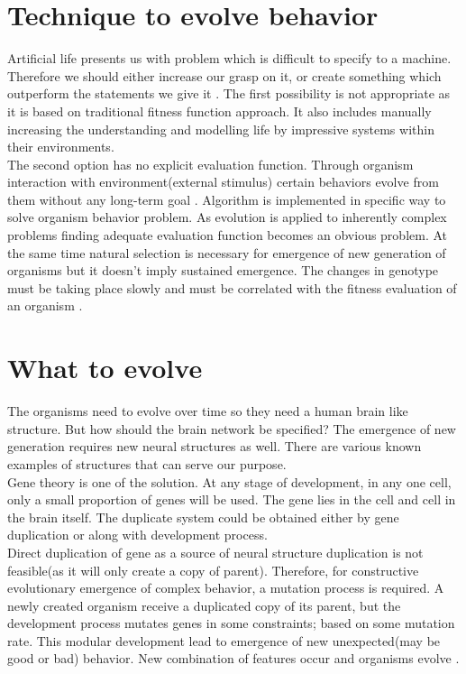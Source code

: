\documentclass[conference]{IEEEtran}
\begin{document}
\section{Technique to evolve behavior}
Artificial life presents us with problem which is difficult to specify to a machine. Therefore we should either increase our grasp on it, or create something which outperform the statements we give it \cite{channon&damper}. The first possibility is not appropriate as it is based on traditional fitness function approach. It also includes manually increasing the understanding and modelling life by impressive systems within their environments.\\
The second option has no explicit evaluation function. Through organism interaction with environment(external stimulus) certain behaviors evolve from them without any long-term goal \cite{soccer-game-evolution}. Algorithm is implemented in specific way to solve organism behavior problem. As evolution is applied to inherently complex problems \cite{algorithms-and-experiments} finding adequate evaluation function becomes an obvious problem. At the same time natural selection is necessary for emergence of new generation of organisms but it doesn't imply sustained emergence. The changes in genotype must be taking place slowly and must be correlated with the fitness evaluation of an organism \cite{mapping-genotype-phenotype}.

\section{What to evolve}
The organisms need to evolve over time so they need a human brain like structure. But how should the brain network be specified? The emergence of new generation requires new neural structures as well. There are various known examples of structures that can serve our purpose.\\
Gene theory is one of the solution. At any stage of development, in any one cell, only a small proportion of genes will be used. The gene lies in the cell and cell in the brain itself. The duplicate system could be obtained either by gene duplication or along with development process.\\
Direct duplication of gene as a source of neural structure duplication is not feasible(as it will only create a copy of parent). Therefore, for constructive evolutionary emergence of complex behavior, a mutation process is required. A newly created organism receive a duplicated copy of its parent, but the development process mutates genes in some constraints; based on some mutation rate. This modular development lead to emergence of new unexpected(may be good or bad) behavior. New combination of features occur and organisms evolve \cite{Stanley}.
\end{document}
